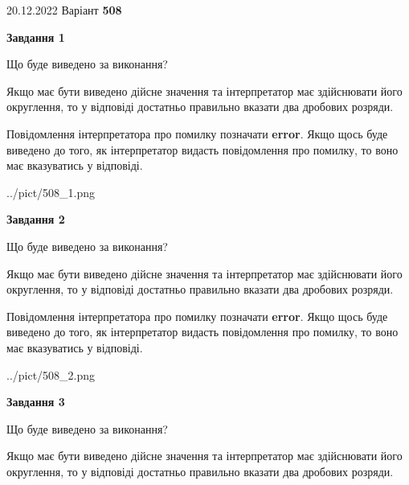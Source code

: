 \documentclass[12pt, ukrainian]{article}
\begin{document}
{20.12.2022 Варіант \No \textbf { 508 }\par}
{
\begin {Large}

{\begin {center}\textbf{Завдання 1}\end {center}}\par
Що буде виведено за виконання? \par

Якщо має бути виведено дійсне значення та інтерпретатор має здійснювати його округлення, 
то у відповіді достатньо правильно вказати два дробових розряди.

Повідомлення інтерпретатора про помилку позначати \textbf{error}.
Якщо щось буде виведено до того, як інтерпретатор видасть повідомлення про помилку, 
то воно має вказуватись у відповіді. \par

\begin{center}
	{../pict/508_1.png}
\end{center}
\newpage

{\begin {center}\textbf{Завдання 2}\end {center}}\par
Що буде виведено за виконання? \par

Якщо має бути виведено дійсне значення та інтерпретатор має здійснювати його округлення, 
то у відповіді достатньо правильно вказати два дробових розряди.

Повідомлення інтерпретатора про помилку позначати \textbf{error}.
Якщо щось буде виведено до того, як інтерпретатор видасть повідомлення про помилку, 
то воно має вказуватись у відповіді. \par

\begin{center}
	{../pict/508_2.png}
\end{center}
\newpage

{\begin {center}\textbf{Завдання 3}\end {center}}\par
Що буде виведено за виконання? \par

Якщо має бути виведено дійсне значення та інтерпретатор має здійснювати його округлення, 
то у відповіді достатньо правильно вказати два дробових розряди.


\end{Large}}
\end{document}
